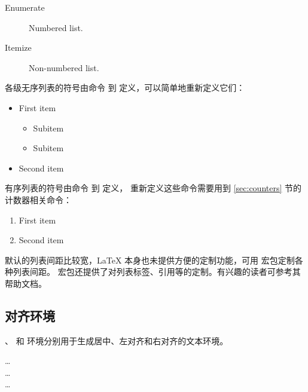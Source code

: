 \begin{example}
\begin{description}
  \item[Enumerate] Numbered list.
  \item[Itemize] Non-numbered list.
\end{description}
\end{example}

各级无序列表的符号由命令  到  定义，可以简单地重新定义它们：
\begin{example}
\renewcommand{\labelitemi}{\ddag}
\renewcommand{\labelitemii}{\dag}
\begin{itemize}
  \item First item
  \begin{itemize}
    \item Subitem
    \item Subitem
  \end{itemize}
  \item Second item
\end{itemize}
\end{example}

有序列表的符号由命令  到  定义，
重新定义这些命令需要用到 \ref{sec:counters} 节的计数器相关命令：
\begin{example}
\renewcommand{\labelenumi}%
  {\Alph{enumi}>}
\begin{enumerate}
  \item First item
  \item Second item
\end{enumerate}
\end{example}

默认的列表间距比较宽，\LaTeX{} 本身也未提供方便的定制功能，可用  宏包定制各种列表间距。
 宏包还提供了对列表标签、引用等的定制。有兴趣的读者可参考其帮助文档。

\subsection{对齐环境}\label{subsec:flush}

、 和  环境分别用于生成居中、左对齐和右对齐的文本环境。
\begin{command}
 \ldots\  \\
 \ldots\  \\
 \ldots\ 
\end{command}


